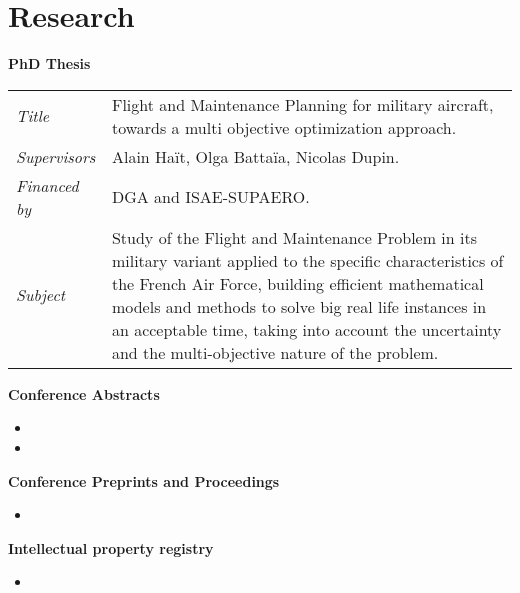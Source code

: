 \section{Research}



    \textbf{PhD Thesis}\\

        \begin{tabular}{p{20mm}p{130mm}}
        \textsl{Title}         &  Flight and Maintenance Planning for military aircraft, towards a multi objective optimization approach.\\
        \textsl{Supervisors}   &  Alain Ha{\"i}t, Olga Batta{\"i}a, Nicolas Dupin. \\
        \textsl{Financed by}   &  DGA and ISAE-SUPAERO. \\
        \textsl{Subject}       &  Study of the Flight and Maintenance Problem in its military variant applied to the specific characteristics of the French Air Force, building efficient mathematical models and methods to solve big real life instances in an acceptable time, taking into account the uncertainty and the multi-objective nature of the problem. \\
    \end{tabular}

    \textbf{Conference Abstracts}
    
    \begin{itemize}
        \item {}
        \item {}
    \end{itemize}

\textbf{Conference Preprints and Proceedings}
    
    \begin{itemize}
        \item {}
    \end{itemize}

\textbf{Intellectual property registry}

    \begin{itemize}
        \item {}
    \end{itemize}

